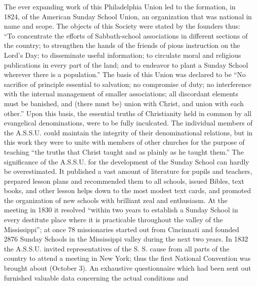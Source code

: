 The ever expanding work of this Philadelphia Union led to the formation, in 1824, of the American Sunday School Union, an organization that was national in name and scope. The objects of this Society were stated by the founders thus: “To concentrate the efforts of Sabbath-school associations
in different sections of the country; to strengthen the hands of the friends of pious instruction on the Lord’s Day; to disseminate useful information; to circulate moral and religious publications in every part of the land; and to endeavor to plant a Sunday School wherever there is a population.” The basis of this Union was declared to be “No sacrifice of principle essential to salvation; no compromise of duty; no interference with the internal management of smaller associations; all discordant elements must be banished, and (there must be) union with Christ, and union with each other.” Upon this basis, the essential truths of Christianity held in common by all evangelical denominations, were to be fully inculcated. The individual members of the A.S.S.U. could maintain the integrity of their denominational relations, but in this work they were to unite with members of other churches for the purpose of teaching “the truths that Christ taught and as plainly as he taught them.” The significance of the A.S.S.U. for the development of the Sunday School can hardly be overestimated. It published a vast amount of literature for pupils and teachers, prepared lesson plans and recommended them to all schools, issued Bibles, text books, and other lesson helps down to the most modest text cards, and promoted the organization of new schools with brilliant zeal and enthusiasm. At the meeting in 1830 it resolved “within two years to establish a Sunday School in every destitute place where it is practicable throughout the valley of the Mississippi”; at once 78 missionaries started out from Cincinnati and founded 2876 Sunday Schools in the Mississippi valley during the next two years. In 1832 the A.S.S.U. invited representatives of the S. S. cause from all parts of the country to attend a meeting in New York; thus the first National Convention was brought about (October 3). An exhaustive questionnaire which had been sent out furnished valuable data concerning the actual conditions and
